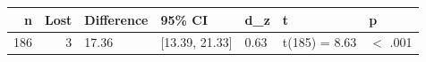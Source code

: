 \begin{tabular}{rrlllll}
  \toprule
n & Lost & Difference & 95\% CI & d\_z & t & p \\ 
  \midrule
186 &   3 & 17.36 & [13.39, 21.33] & 0.63 & t(185) = 8.63 & $<$ .001 \\ 
   \bottomrule
\end{tabular}

